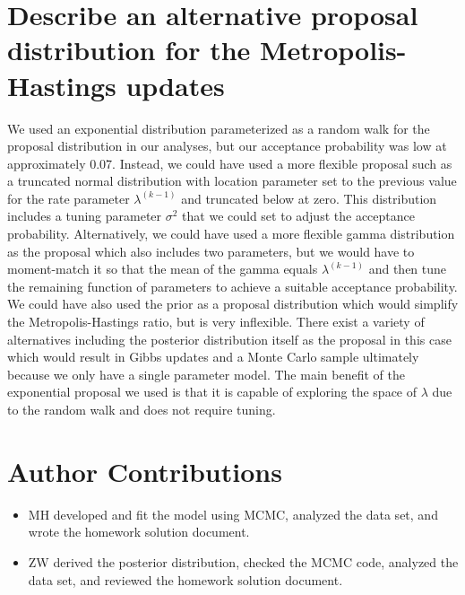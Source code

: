 \documentclass[12pt]{article} \topmargin=.1in \oddsidemargin=.25in
\begin{document}
\section{Describe an alternative proposal distribution for the Metropolis-Hastings updates}
We used an exponential distribution parameterized as a random walk for the proposal distribution in our analyses, but our acceptance probability was low at approximately 0.07.  Instead, we could have used a more flexible proposal such as a truncated normal distribution with location parameter set to the previous value for the rate parameter $\lambda^{(k-1)}$ and truncated below at zero.  This distribution includes a tuning parameter $\sigma^2$ that we could set to adjust the acceptance probability.  Alternatively, we could have used a more flexible gamma distribution as the proposal which also includes two parameters, but we would have to moment-match it so that the mean of the gamma equals $\lambda^{(k-1)}$ and then tune the remaining function of parameters to achieve a suitable acceptance probability.  We could have also used the prior as a proposal distribution which would simplify the Metropolis-Hastings ratio, but is very inflexible.  There exist a variety of alternatives including the posterior distribution itself as the proposal in this case which would result in Gibbs updates and a Monte Carlo sample ultimately because we only have a single parameter model.  The main benefit of the exponential proposal we used is that it is capable of exploring the space of $\lambda$ due to the random walk and does not require tuning.     


\section*{Author Contributions}

\begin{itemize}
  \item MH developed and fit the model using MCMC, analyzed the data set, and wrote the homework solution document.
  \item ZW derived the posterior distribution, checked the MCMC code, analyzed the data set, and reviewed the homework solution document. 
\end{itemize}


\pagebreak
\baselineskip=12pt
\footnotesize
\end{document}
